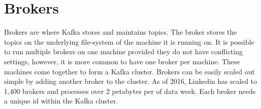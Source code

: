 \section{Brokers}

Brokers are where Kafka stores and maintains topics. The broker stores the topics on the underlying file-system of the machine it is running on. It is possible to run multiple brokers on one machine provided they do not have conflicting settings, however, it is more common to have one broker per machine. These machines come together to form a Kafka cluster. Brokers can be easily scaled out simple by adding another broker to the cluster. As of 2016, Linkedin has scaled to 1,400 brokers and processes over 2 petabytes per of data week\cite{linkedin:brokers}. Each broker needs a unique id within the Kafka cluster.

